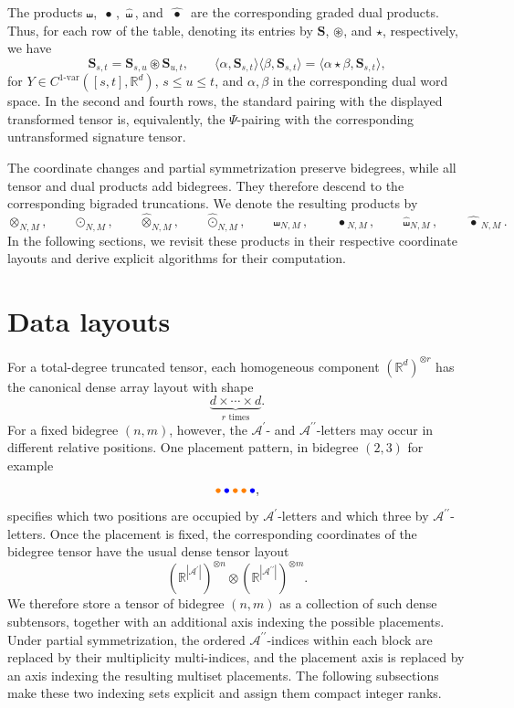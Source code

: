 \documentclass{amsart}
\theoremstyle{definition}
\theoremstyle{remark}
\newcommand{\gammashuffle}{{\,\bullet\,}}
\newcommand{\gammashufflesym}{{\,\widehat{\gammashuffle}\,}}
\newcommand{\blue}[1]{{\color{blue}#1}}
\newcommand{\orange}[1]{{\color{orange}#1}}
\begin{document}
The products
$\shuffle$, $\gammashuffle$, $\widehat{\shuffle}$, and
$\gammashufflesym$ are the corresponding graded dual products. Thus, for
each row of the table, denoting its entries by
$\mathbf{S}$, $\circledast$, and $\star$, respectively, we have
\[
    \mathbf{S}_{s,t}
    =
    \mathbf{S}_{s,u}
    \circledast
    \mathbf{S}_{u,t},
    \qquad
    \big\langle\alpha,\mathbf{S}_{s,t}\big\rangle
    \big\langle\beta,\mathbf{S}_{s,t}\big\rangle
    =
    \big\langle
        \alpha\star\beta,
        \mathbf{S}_{s,t}
    \big\rangle,
\]
for $Y\in C^{1\text{-var}}([s,t],\mathbb{R}^d)$, $s\leq u\leq t$, and
$\alpha,\beta$ in the corresponding dual word space. In the second and
fourth rows, the standard pairing with the displayed transformed tensor is,
equivalently, the $\Psi$-pairing with the corresponding untransformed
signature tensor.

The coordinate changes and partial symmetrization preserve bidegrees, while
all tensor and dual products add bidegrees. They therefore descend to the
corresponding bigraded truncations. We denote the resulting products by
\[
    \otimes_{N,M},
    \qquad
    \odot_{N,M},
    \qquad
    \widehat{\otimes}_{N,M},
    \qquad
    \widehat{\odot}_{N,M},
    \qquad
    \shuffle_{N,M},
    \qquad
    \gammashuffle_{N,M},
    \qquad
    \widehat{\shuffle}_{N,M},
    \qquad
    \gammashufflesym_{N,M}.
\]
In the following sections, we revisit these products in their respective
coordinate layouts and derive explicit algorithms for their computation.

\section{Data layouts}
\label{sec:data_layouts}

For a total-degree truncated tensor, each homogeneous component
$(\mathbb{R}^{d})^{\otimes r}$ has the canonical dense array layout with
shape
\[
    \underbrace{d\times\cdots\times d}_{r\text{ times}}.
\]
For a fixed bidegree $(n,m)$, however, the
$\mathcal{A}^{\prime}$- and $\mathcal{A}^{\prime\prime}$-letters may occur
in different relative positions.
One placement pattern, in bidegree $(2,3)$ for example
\[
    \orange{\bullet}\,
    \blue{\bullet}\,
    \orange{\bullet}\,
    \orange{\bullet}\,
    \blue{\bullet},
\]
specifies which two positions are occupied by
$\mathcal{A}^{\prime}$-letters and which three by
$\mathcal{A}^{\prime\prime}$-letters. Once the placement is fixed, the
corresponding coordinates of the bidegree tensor have the usual dense tensor
layout
\[
    (\mathbb{R}^{|\mathcal{A}^{\prime}|})^{\otimes n}
    \otimes
    (\mathbb{R}^{|\mathcal{A}^{\prime\prime}|})^{\otimes m}.
\]
We therefore store a tensor of bidegree $(n,m)$ as a collection of such
dense subtensors, together with an additional axis indexing the possible
placements. Under partial symmetrization, the ordered
$\mathcal{A}^{\prime\prime}$-indices within each block are replaced by
their multiplicity multi-indices, and the placement axis is replaced by an
axis indexing the resulting multiset placements. The following subsections
make these two indexing sets explicit and assign them compact integer ranks.
\end{document}
